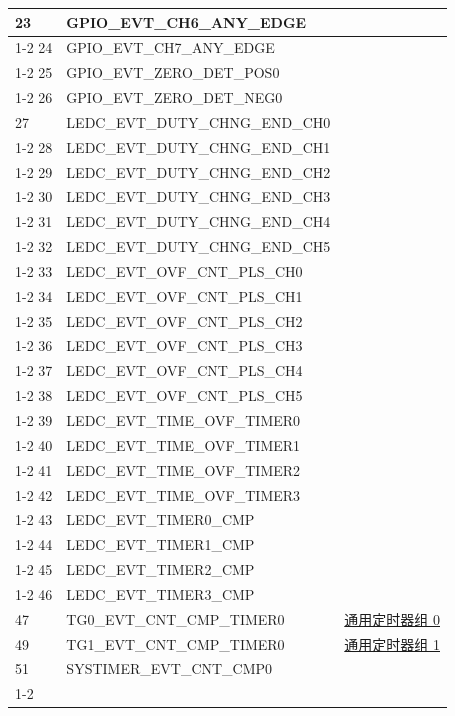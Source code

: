 \documentclass[main\_\_CN.tex]{subfiles}
\begin{document}
\begin{longtable}{ | l | l | l | }
23  & GPIO\_EVT\_CH6\_ANY\_EDGE &  \\ \cline{1-2}
24  & GPIO\_EVT\_CH7\_ANY\_EDGE &  \\ \cline{1-2}
25  & GPIO\_EVT\_ZERO\_DET\_POS0 &  \\ \cline{1-2}
26  & GPIO\_EVT\_ZERO\_DET\_NEG0 &  \\ \hline
27  & LEDC\_EVT\_DUTY\_CHNG\_END\_CH0  & \nameref{mod:ledpwm}\\ \cline{1-2}
28  & LEDC\_EVT\_DUTY\_CHNG\_END\_CH1  & \\ \cline{1-2}
29  & LEDC\_EVT\_DUTY\_CHNG\_END\_CH2  & \\ \cline{1-2}
30  & LEDC\_EVT\_DUTY\_CHNG\_END\_CH3  & \\ \cline{1-2}
31  & LEDC\_EVT\_DUTY\_CHNG\_END\_CH4  & \\ \cline{1-2}
32  & LEDC\_EVT\_DUTY\_CHNG\_END\_CH5  & \\ \cline{1-2}
33  & LEDC\_EVT\_OVF\_CNT\_PLS\_CH0    & \\ \cline{1-2}
34  & LEDC\_EVT\_OVF\_CNT\_PLS\_CH1    & \\ \cline{1-2}
35  & LEDC\_EVT\_OVF\_CNT\_PLS\_CH2    & \\ \cline{1-2}
36  & LEDC\_EVT\_OVF\_CNT\_PLS\_CH3    & \\ \cline{1-2}
37  & LEDC\_EVT\_OVF\_CNT\_PLS\_CH4    & \\ \cline{1-2}
38  & LEDC\_EVT\_OVF\_CNT\_PLS\_CH5    & \\ \cline{1-2}
39  & LEDC\_EVT\_TIME\_OVF\_TIMER0     & \\ \cline{1-2}
40  & LEDC\_EVT\_TIME\_OVF\_TIMER1     & \\ \cline{1-2}
41  & LEDC\_EVT\_TIME\_OVF\_TIMER2     & \\ \cline{1-2}
42  & LEDC\_EVT\_TIME\_OVF\_TIMER3     & \\ \cline{1-2}
43  & LEDC\_EVT\_TIMER0\_CMP    & \\ \cline{1-2}
44  & LEDC\_EVT\_TIMER1\_CMP    & \\ \cline{1-2}
45  & LEDC\_EVT\_TIMER2\_CMP    & \\ \cline{1-2}
46  & LEDC\_EVT\_TIMER3\_CMP    & \\ \hline
47  & TG0\_EVT\_CNT\_CMP\_TIMER0    & \hyperref[mod:timg]{通用定时器组 0}   \\ \hline
49  & TG1\_EVT\_CNT\_CMP\_TIMER0    & \hyperref[mod:timg]{通用定时器组 1}   \\ \hline
51  & SYSTIMER\_EVT\_CNT\_CMP0  & \nameref{mod:systimer}     \\ \cline{1-2}

\end{longtable}
\end{document}
